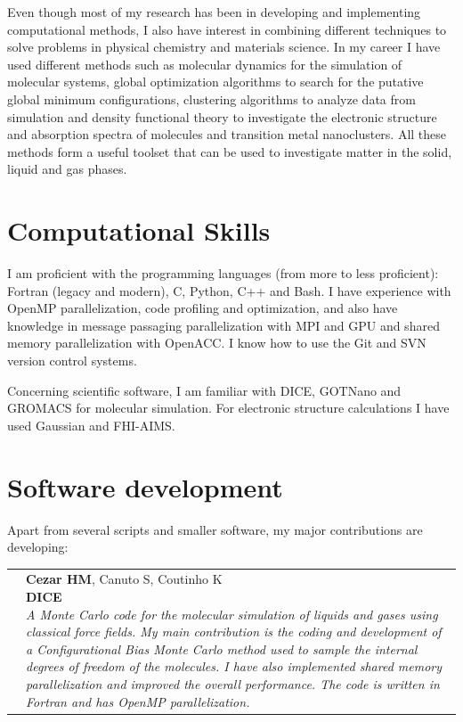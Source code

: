 \documentclass[10pt]{article}
\newcommand{\newsoftware}[3]{
\begin{adjustwidth}{-1in}{-1in}  
\begin{tabular}{p{0.9in}p{7in}}
\parbox[c]{0.9in}{} & \parbox[c]{6in}{\setstretch{0.9} {\scriptsize {#1}} \\ {\bf #2}  \\ {\footnotesize\emph {#3}}}
\end{tabular}
\end{adjustwidth}
\vspace{0.2in}
}
\begin{document}
Even though most of my research has been in developing and implementing computational methods, I also have interest in combining different techniques to solve problems in physical chemistry and materials science.
In my career I have used different methods such as molecular dynamics for the simulation of molecular systems, global optimization algorithms to search for the putative global minimum configurations, clustering algorithms to analyze data from simulation and density functional theory to investigate the electronic structure and absorption spectra of molecules and transition metal nanoclusters.
All these methods form a useful toolset that can be used to investigate matter in the solid, liquid and gas phases.

\section*{Computational Skills}
I am proficient with the programming languages (from more to less proficient): Fortran (legacy and modern), C, Python, C++ and Bash. I have experience with OpenMP parallelization, code profiling and optimization, and also have knowledge in message passaging parallelization with MPI and GPU and shared memory parallelization with OpenACC. I know how to use the Git and SVN version control systems.

Concerning scientific software, I am familiar with DICE, GOTNano and GROMACS for molecular simulation. For electronic structure calculations I have used Gaussian and FHI-AIMS.





\section*{Software development}
Apart from several scripts and smaller software, my major contributions are developing:\\

\newsoftware{\textbf{Cezar HM}, Canuto S, Coutinho K}{DICE}{A Monte Carlo code for the molecular simulation of liquids and gases using classical force fields. My main contribution is the coding and development of a Configurational Bias Monte Carlo method used to sample the internal degrees of freedom of the molecules. I have also implemented shared memory parallelization and improved the overall performance. The code is written in Fortran and has OpenMP parallelization.}
\end{document}
